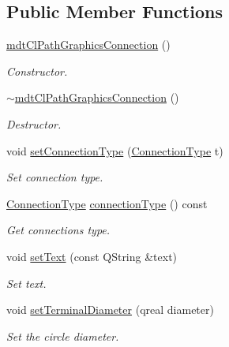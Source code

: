 \subsection*{Public Member Functions}
\begin{DoxyCompactItemize}
\item 
\hyperlink{classmdt_cl_path_graphics_connection_a7674251ddd8a5a4b171c9b80c8d06044}{mdt\-Cl\-Path\-Graphics\-Connection} ()
\begin{DoxyCompactList}\small\item\em Constructor. \end{DoxyCompactList}\item 
\hyperlink{classmdt_cl_path_graphics_connection_a8406346c8fcf21e3dc4a860fa129a84a}{$\sim$mdt\-Cl\-Path\-Graphics\-Connection} ()
\begin{DoxyCompactList}\small\item\em Destructor. \end{DoxyCompactList}\item 
void \hyperlink{classmdt_cl_path_graphics_connection_a37cf19dcb316a7405ce3d15ad3e00123}{set\-Connection\-Type} (\hyperlink{classmdt_cl_path_graphics_connection_af26f48d07af6395c5395d8078facb3a5}{Connection\-Type} t)
\begin{DoxyCompactList}\small\item\em Set connection type. \end{DoxyCompactList}\item 
\hyperlink{classmdt_cl_path_graphics_connection_af26f48d07af6395c5395d8078facb3a5}{Connection\-Type} \hyperlink{classmdt_cl_path_graphics_connection_aaaf40f729f861bf33d87acd365dbfce8}{connection\-Type} () const 
\begin{DoxyCompactList}\small\item\em Get connections type. \end{DoxyCompactList}\item 
void \hyperlink{classmdt_cl_path_graphics_connection_ad7888c8d45bb20629a80a5643ac1b153}{set\-Text} (const Q\-String \&text)
\begin{DoxyCompactList}\small\item\em Set text. \end{DoxyCompactList}\item 
void \hyperlink{classmdt_cl_path_graphics_connection_a738b0a1454be2ac577f269550f247291}{set\-Terminal\-Diameter} (qreal diameter)
\begin{DoxyCompactList}\small\item\em Set the circle diameter. \end{DoxyCompactList}\item 

\end{DoxyCompactItemize}
